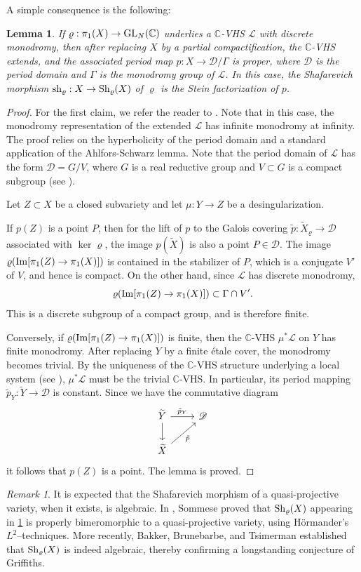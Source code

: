 \documentclass[english]{amsproc}
\theoremstyle{plain}
\newtheorem{lem}[thm]{Lemma}
\theoremstyle{definition}
\theoremstyle{remark}
\newtheorem{rem}[thm]{Remark}
\theoremstyle{plain}
\numberwithin{equation}{thm} %
\newcommand{\sD}{\mathscr{D}}
\newcommand{\cL}{\mathcal L}
\newcommand{\bC}{\mathbb{C}}
\newcommand{\GL}{{\rm GL}}
\begin{document}
A simple consequence is the following:

\begin{lem}\label{lem:period}
	If   $\varrho:\pi_1(X)\to \GL_{N}(\bC)$ underlies a $\bC$-VHS $\cL$ with discrete monodromy, then after replacing $X$ by a partial compactification, the $\bC$-VHS extends, and the associated period map $p:X\to \sD/\Gamma$ is proper, where $\sD$ is the period domain and $\Gamma$ is the monodromy group of $\cL$. In this case, the Shafarevich morphism ${\rm sh}_\varrho:X\to {\rm Sh}_\varrho(X)$ of $\varrho$ is the Stein factorization of $p$.
\end{lem}

\begin{proof}
	For the first claim, we refer the reader to \cite{Gri70}. Note that in this case, the monodromy representation of the extended $\cL$ has infinite monodromy at infinity. The proof relies on the hyperbolicity of the period domain and a standard application of the Ahlfors-Schwarz lemma.   Note that the period domain of $\cL$ has the form $\sD=G/V$, where $G$ is a real reductive group and $V\subset G$ is a compact subgroup (see \cite{CMP17}).
	
	Let $Z\subset X$ be a closed subvariety and let $\mu:Y\to Z$ be a desingularization.
	
	If $p(Z)$ is a point $P$, then for the lift of $p$ to the Galois  covering $\tilde{p}:\widetilde{X}_\varrho\to \sD$ associated with $\ker\varrho$, the image $p(\widetilde{X})$ is also a point $P\in \sD$. The image $\varrho({\rm Im}[\pi_1(Z)\to \pi_1(X)])$ is contained in the stabilizer of $P$, which is a conjugate $V'$ of $V$, and hence is compact. On the other hand, since $\cL$ has discrete monodromy,
	$$
	\varrho({\rm Im}[\pi_1(Z)\to \pi_1(X)]) \subset \Gamma\cap V'.
	$$
	This is a discrete subgroup of a compact group, and is therefore finite.  
	
	Conversely, if $\varrho({\rm Im}[\pi_1(Z)\to \pi_1(X)])$ is finite, then the $\bC$-VHS $\mu^*\cL$ on $Y$ has finite monodromy. After replacing $Y$ by a finite \'etale cover, the monodromy becomes trivial. By the uniqueness of the $\bC$-VHS structure underlying a local system (see \cite{Sch73}), $\mu^*\cL$ must be the trivial $\bC$-VHS. In particular, its period mapping $\tilde{p}_Y:\widetilde{Y}\to \sD$ is constant. Since we have the commutative diagram
	\[
	\begin{tikzcd}
		\widetilde{Y}\arrow[d] \arrow[r,"\tilde{p}_Y"] &\sD\\
		\widetilde{X} \arrow[ur,"\tilde{p}"'] &
	\end{tikzcd}
	\]
	it follows that $p(Z)$ is a point. The lemma is proved.
\end{proof}
\begin{rem}
It is expected that the Shafarevich morphism of a quasi-projective variety, when it exists, is algebraic. In \cite{Som78}, Sommese proved that ${\rm Sh}_\varrho(X)$ appearing in \cref{lem:period} is properly bimeromorphic to a quasi-projective variety, using H\"ormander’s $L^2$–techniques. More recently, Bakker, Brunebarbe, and Tsimerman \cite{BBT23} established that ${\rm Sh}_\varrho(X)$ is indeed algebraic, thereby confirming a longstanding conjecture of Griffiths.
\end{rem}
\end{document}
